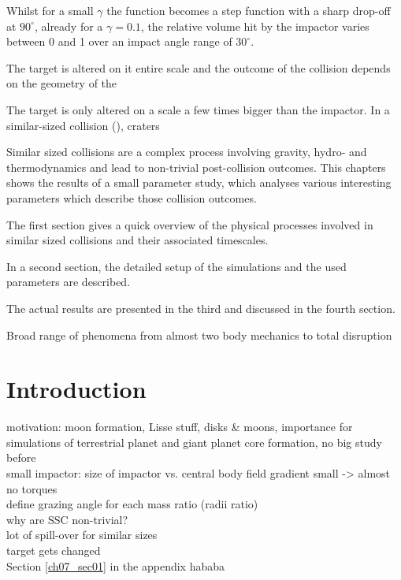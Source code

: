 Whilst for a small $\gamma$ the function becomes a step function with a sharp drop-off at $90^\circ$, already for a $\gamma = 0.1$, the relative volume hit by the impactor varies between 0 and 1 over an impact angle range of $30^\circ$. 









The target is altered on it entire scale and the outcome of the collision depends on the geometry of the 

The target is only altered on a scale a few times bigger than the impactor. In a similar-sized collision (\SSC), craters 



Similar sized collisions are a complex process involving gravity, hydro- and thermodynamics and lead to non-trivial post-collision outcomes. This chapters shows the results of a small parameter study, which analyses various interesting parameters which describe those collision outcomes.


The first section gives a quick overview of the physical processes involved in similar sized collisions and their associated timescales.

In a second section, the detailed setup of the simulations and the used parameters are described.

The actual results are presented in the third and discussed in the fourth section.

Broad range of phenomena from almost two body mechanics to total disruption



\section{Introduction}
motivation: moon formation, Lisse stuff, disks \& moons, importance for simulations of terrestrial planet and giant planet core formation, no big study before \\
small impactor: size of impactor vs. central body field gradient small -> almost no torques \\
define grazing angle for each mass ratio (radii ratio) \\
why are SSC non-trivial? \\
lot of spill-over for similar sizes \\
target gets changed \\
Section \ref{ch07_sec01} in the appendix hababa \\


